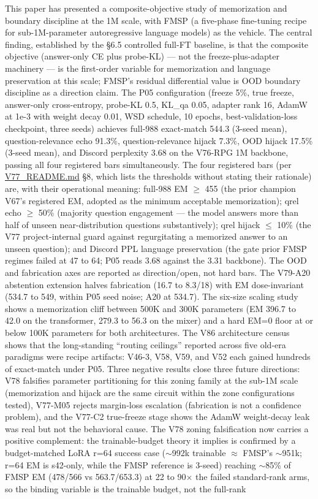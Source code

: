 \documentclass[11pt]{article}
\begin{document}
This paper has presented a composite-objective study of memorization and boundary discipline at the 1M scale, with FMSP (a five-phase fine-tuning recipe for sub-1M-parameter autoregressive language models) as the vehicle. The central finding, established by the \S6.5 controlled full-FT baseline, is that the composite objective (answer-only CE plus probe-KL) --- not the freeze-plus-adapter machinery --- is the first-order variable for memorization and language preservation at this scale; FMSP's residual differential value is OOD boundary discipline as a direction claim. The P05 configuration (freeze 5\%, true freeze, answer-only cross-entropy, probe-KL 0.5, KL\_qa 0.05, adapter rank 16, AdamW at 1e-3 with weight decay 0.01, WSD schedule, 10 epochs, best-validation-loss checkpoint, three seeds) achieves full-988 exact-match 544.3 (3-seed mean), question-relevance echo 91.3\%, question-relevance hijack 7.3\%, OOD hijack 17.5\% (3-seed mean), and Discord perplexity 3.68 on the V76-RPG 1M backbone, passing all four registered bars simultaneously. The four registered bars (per \href{https://github.com/llaa33219/MicroMixer-4/blob/4bb630413dfa58ef3141291e121ab8c006d03235/V77_README.md}{V77\_README.md} \S8, which lists the thresholds without stating their rationale) are, with their operational meaning: full-988 EM $\geq$ 455 (the prior champion V67's registered EM, adopted as the minimum acceptable memorization); qrel echo $\geq$ 50\% (majority question engagement --- the model answers more than half of unseen near-distribution questions substantively); qrel hijack $\leq$ 10\% (the V77 project-internal guard against regurgitating a memorized answer to an unseen question); and Discord PPL language preservation (the gate prior FMSP regimes failed at 47 to 64; P05 reads 3.68 against the 3.31 backbone). The OOD and fabrication axes are reported as direction/open, not hard bars. The V79-A20 abstention extension halves fabrication (16.7 to 8.3/18) with EM dose-invariant (534.7 to 549, within P05 seed noise; A20 at 534.7). The six-size scaling study shows a memorization cliff between 500K and 300K parameters (EM 396.7 to 42.0 on the transformer, 279.3 to 56.3 on the mixer) and a hard EM=0 floor at or below 100K parameters for both architectures. The V86 architecture census shows that the long-standing ``routing ceilings'' reported across five old-era paradigms were recipe artifacts: V46-3, V58, V59, and V52 each gained hundreds of exact-match under P05. Three negative results close three future directions: V78 falsifies parameter partitioning for this zoning family at the sub-1M scale (memorization and hijack are the same circuit within the zone configurations tested), V77-M05 rejects margin-loss escalation (fabrication is not a confidence problem), and the V77-C2 true-freeze stage shows the AdamW weight-decay leak was real but not the behavioral cause. The V78 zoning falsification now carries a positive complement: the trainable-budget theory it implies is confirmed by a budget-matched LoRA r=64 success case ($\sim$992k trainable $\approx$ FMSP's $\sim$951k; r=64 EM is s42-only, while the FMSP reference is 3-seed) reaching $\sim$85\% of FMSP EM (478/566 vs 563.7/653.3) at 22 to 90$\times$ the failed standard-rank arms, so the binding variable is the trainable budget, not the full-rank 
\end{document}
